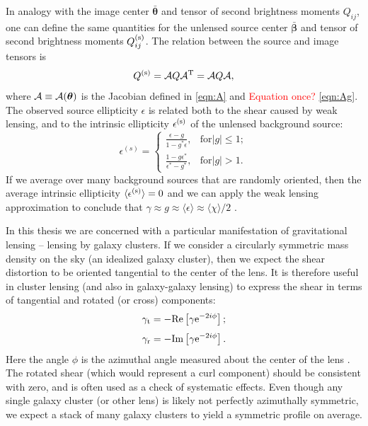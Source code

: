 In analogy with the image center $\bm{\bar{\theta}}$ and tensor of second brightness moments $Q_{ij}$, one can define the same quantities for the unlensed source center $\bm{\bar{\beta}}$ and tensor of second brightness moments $Q_{ij}^{\rm (s)}$. The relation between the source and image tensors is
\begin{equation}
Q^{\rm (s)} = {\cal A} Q {\cal A}^{\rm T} = {\cal A} Q {\cal A},
\end{equation}
where ${\cal A} \equiv {\cal A}(\bm{\theta})$ is the Jacobian defined in \autoref{eqn:A} and \textcolor{red}{Equation once?} \autoref{eqn:Ag}. The observed source ellipticity $\epsilon$ is related both to the shear caused by weak lensing, and to the intrinsic ellipticity $\epsilon^{\rm (s)}$ of the unlensed background source:
\begin{equation} 
\epsilon^{(s)} = 
    \begin{cases}
        \frac{\epsilon - g}{1-g^*\epsilon}, & \text{for} |g| \le 1; \\
        \frac{1-g\epsilon^*}{\epsilon^* - g^*}, & \text{for} |g| > 1.
    \end{cases}
\end{equation}
If we average over many background sources that are randomly oriented, then the average intrinsic ellipticity $\langle \epsilon^{\rm (s)} \rangle = 0$ and we can apply the weak lensing approximation to conclude that $\gamma \approx g \approx \langle \epsilon \rangle \approx  \langle \chi \rangle /2$ \citep{BS01}. 

In this thesis we are concerned with a particular manifestation of gravitational lensing -- lensing by galaxy clusters. If we consider a circularly symmetric mass density on the sky (an idealized galaxy cluster), then we expect the shear distortion to be oriented tangential to the center of the lens. It is therefore useful in cluster lensing (and also in galaxy-galaxy lensing) to express the shear in terms of tangential and rotated (or cross) components:
\begin{equation}
\gamma_{\rm t} = -{\rm Re}\left[ \gamma {\rm e}^{-2i\phi} \right];  
\end{equation}
\begin{equation}
\gamma_{\rm r} = -{\rm Im}\left[ \gamma {\rm e}^{-2i\phi} \right].
\end{equation}
Here the angle $\phi$ is the azimuthal angle measured about the center of the lens \citep{Schneider06_WeakGravLens}. The rotated shear (which would represent a curl component) should be consistent with zero, and is often used as a check of systematic effects. Even though any single galaxy cluster (or other lens) is likely not perfectly azimuthally symmetric, we expect a stack of many galaxy clusters to yield a symmetric profile on average.

